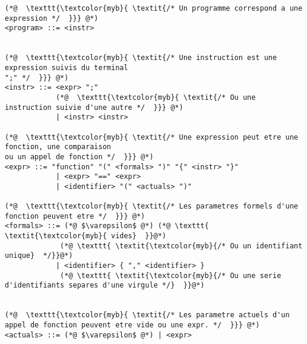 \documentclass{report}
\begin{document}
\begin{paracol}{2}
        \footnotesize









\begin{adjustbox}{width=0.66\linewidth}
\begin{lstlisting}
(*@  \texttt{\textcolor{myb}{ \textit{/* Un programme correspond a une expression */  }}} @*)
<program> ::= <instr>


(*@  \texttt{\textcolor{myb}{ \textit{/* Une instruction est une expression suivis du terminal 
";" */  }}} @*)
<instr> ::= <expr> ";"
            (*@  \texttt{\textcolor{myb}{ \textit{/* Ou une instruction suivie d'une autre */  }}} @*)
            | <instr> <instr>

(*@  \texttt{\textcolor{myb}{ \textit{/* Une expression peut etre une fonction, une comparaison 
ou un appel de fonction */  }}} @*)
<expr> ::= "function" "(" <formals> ")" "{" <instr> "}"
            | <expr> "==" <expr>
            | <identifier> "(" <actuals> ")"

(*@  \texttt{\textcolor{myb}{ \textit{/* Les parametres formels d'une fonction peuvent etre */  }}} @*)
<formals> ::= (*@ $\varepsilon$ @*) (*@ \texttt{ \textit{\textcolor{myb}{ vides}  }}@*)
             (*@ \texttt{ \textit{\textcolor{myb}{/* Ou un identifiant unique}  */}}@*) 
            | <identifier> { "," <identifier> }
             (*@ \texttt{ \textit{\textcolor{myb}{/* Ou une serie d'identifiants separes d'une virgule */}  }}@*)
            

(*@  \texttt{\textcolor{myb}{ \textit{/* Les parametre actuels d'un appel de fonction peuvent etre vide ou une expr. */  }}} @*)
<actuals> ::= (*@ $\varepsilon$ @*) | <expr>\end{lstlisting}

\end{adjustbox}


\switchcolumn

\end{paracol}
\end{document}
